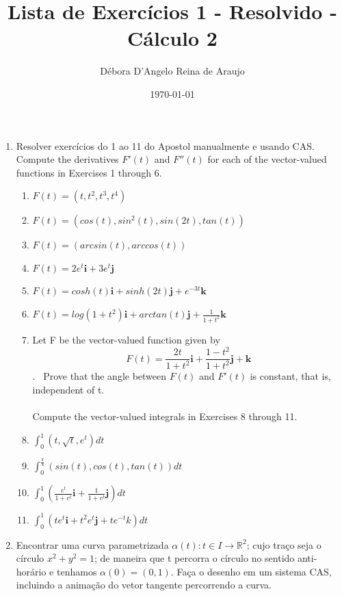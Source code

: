 \documentclass{article}
\begin{document}
\title{Lista de Exercícios 1 - Resolvido - Cálculo 2}
\author{Débora D'Angelo Reina de Araujo}
\date{\today}

\maketitle

\begin{enumerate}
    \item Resolver exercícios do 1 ao 11 do Apostol manualmente e usando CAS. \\
    Compute the derivatives $F'(t)$ and $F''(t)$ for each of the vector-valued functions in Exercises 1 through 6. \
        \begin{enumerate}[label=1.\arabic*.]
            \item $F(t) = (t, t^2, t^3, t^4)$ \
            \item $F(t) = (cos(t), sin^2(t), sin(2t), tan(t))$ \
            \item $F(t) = (arcsin(t), arccos(t))$ \
            \item $F(t) = 2e^t\textbf{i} + 3e^t\textbf{j}$ \
            \item $F(t) = cosh(t) \textbf{i} + sinh(2t) \textbf{j} + e^{-3t}\textbf{k}$ \
            \item $F(t) = log(1+t^2)\textbf{i} + arctan(t) \textbf{j} + \frac{1}{1+t^2}\textbf{k}$ \
            \item Let F be the vector-valued function given by \\
                $$F(t) = \frac{2t}{1+t^2}\textbf{i} + \frac{1-t^2}{1+t^2}\textbf{j} + \textbf{k}$$. \
                Prove that the angle between $F(t)$ and $F'(t)$ is constant, that is, independent of t. \\
                \\
            Compute the vector-valued integrals in Exercises 8 through 11. \
            \item $\int_{0}^{1} (t, \sqrt{t}, e^t)dt$ \
            \item $\int_{0}^{\frac{\pi}{4}} (sin(t), cos(t), tan(t))dt$ \
            \item $\int_{0}^{1} (\frac{e^t}{1+e^t}\textbf{i} + \frac{1}{1+e^t}\textbf{j})dt$ \
            \item $\int_{0}^{1} (te^t\textbf{i} + t^2e^t\textbf{j} + te^{-t}k)dt$
        \end{enumerate}
    \item Encontrar uma curva parametrizada $\alpha(t) : t \in I \to \mathbb{R}^2$; cujo traço seja o círculo $x^2 + y^2 = 1$; de maneira que t percorra o círculo no sentido anti-horário e tenhamos $\alpha(0) = (0, 1)$. Faça o desenho em um sistema CAS, incluindo a animação do vetor tangente percorrendo a curva. \

\end{enumerate}
\end{document}
